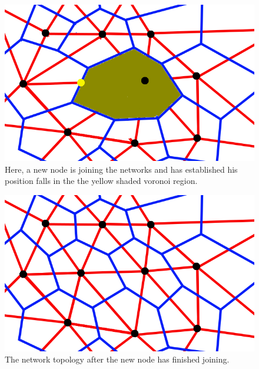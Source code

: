\documentclass[11pt]{IEEEtran} %
\begin{document}
\begin{figure}
    \includegraphics[width=\linewidth]{voronoi-churn4}
    \caption{Here, a new node is joining the networks and has established his position falls in the the yellow shaded voronoi region.}
    \label{churnjoin}
\end{figure}


\begin{figure}
    \includegraphics[width=\linewidth]{voronoi-example}
    \caption{The network topology after the new node has finished joining.}
    \label{churndone}
\end{figure}
\end{document}
